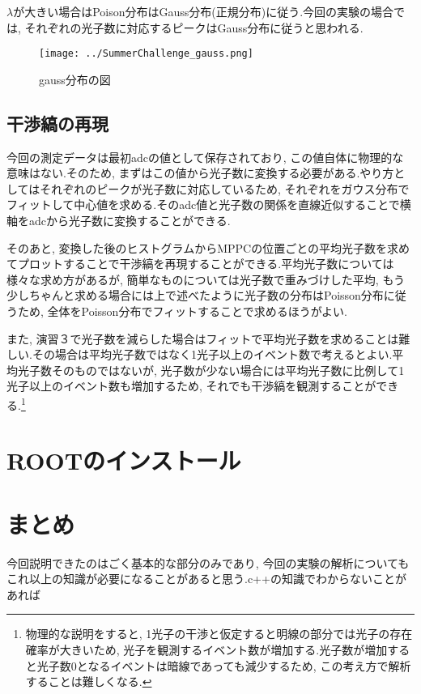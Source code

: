 \documentclass[uplatex,10pt,a4j]{jsarticle}
\begin{document}
$\lambda$が大きい場合はPoison分布はGauss分布(正規分布)に従う.今回の実験の場合では, それぞれの光子数に対応するピークはGauss分布に従うと思われる.
\begin{figure}[h]
  \begin{center}
    \texttt{[image: ../SummerChallenge\_gauss.png]}
    \caption{gauss分布の図}
    \label{fig:gauss}
  \end{center}
\end{figure}

\subsection{干渉縞の再現}
今回の測定データは最初adcの値として保存されており, この値自体に物理的な意味はない.そのため, まずはこの値から光子数に変換する必要がある.やり方としてはそれぞれのピークが光子数に対応しているため, それぞれをガウス分布でフィットして中心値を求める.そのadc値と光子数の関係を直線近似することで横軸をadcから光子数に変換することができる.

そのあと, 変換した後のヒストグラムからMPPCの位置ごとの平均光子数を求めてプロットすることで干渉縞を再現することができる.平均光子数については様々な求め方があるが, 簡単なものについては光子数で重みづけした平均, もう少しちゃんと求める場合には上で述べたように光子数の分布はPoisson分布に従うため, 全体をPoisson分布でフィットすることで求めるほうがよい.

また, 演習３で光子数を減らした場合はフィットで平均光子数を求めることは難しい.その場合は平均光子数ではなく1光子以上のイベント数で考えるとよい.平均光子数そのものではないが, 光子数が少ない場合には平均光子数に比例して1光子以上のイベント数も増加するため, それでも干渉縞を観測することができる.\footnote{物理的な説明をすると, 1光子の干渉と仮定すると明線の部分では光子の存在確率が大きいため, 光子を観測するイベント数が増加する.光子数が増加すると光子数0となるイベントは暗線であっても減少するため, この考え方で解析することは難しくなる.}

\clearpage
\section{ROOTのインストール}
\label{sec:root_installation}


\clearpage
\section{まとめ}
\label{sec:lastsection}
今回説明できたのはごく基本的な部分のみであり, 今回の実験の解析についてもこれ以上の知識が必要になることがあると思う.c++の知識でわからないことがあれば
\end{document}
